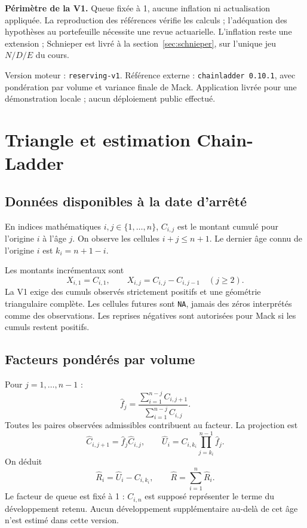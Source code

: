 \documentclass[11pt,a4paper]{article}
\newcommand{\smallnote}[1]{{\small\color{Muted}#1}}
\begin{document}
\begin{limitbox}
\textbf{Périmètre de la V1.} Queue fixée à 1, aucune inflation ni actualisation appliquée. La reproduction des références vérifie les calculs ; l'adéquation des hypothèses au portefeuille nécessite une revue actuarielle. L'inflation reste une extension ; Schnieper est livré à la section~\ref{sec:schnieper}, sur l'unique jeu $N/D/E$ du cours.
\end{limitbox}

\smallnote{Version moteur : \texttt{reserving-v1}. Référence externe : \texttt{chainladder 0.10.1}, avec pondération par volume et variance finale de Mack. Application livrée pour une démonstration locale ; aucun déploiement public effectué.}

\newpage
\section{Triangle et estimation Chain-Ladder}
\subsection*{Données disponibles à la date d'arrêté}
En indices mathématiques $i,j\in\{1,\ldots,n\}$, $C_{i,j}$ est le montant cumulé pour l'origine $i$ à l'âge $j$. On observe les cellules $i+j\leq n+1$. Le dernier âge connu de l'origine $i$ est $k_i=n+1-i$.

Les montants incrémentaux sont
\[
X_{i,1}=C_{i,1},\qquad X_{i,j}=C_{i,j}-C_{i,j-1}\quad(j\geq2).
\]
La V1 exige des cumuls observés strictement positifs et une géométrie triangulaire complète. Les cellules futures sont \texttt{NA}, jamais des zéros interprétés comme des observations. Les reprises négatives sont autorisées pour Mack si les cumuls restent positifs.

\subsection*{Facteurs pondérés par volume}
Pour $j=1,\ldots,n-1$ :
\[
\boxed{\widehat f_j=\frac{\sum_{i=1}^{n-j}C_{i,j+1}}{\sum_{i=1}^{n-j}C_{i,j}}.}
\]
Toutes les paires observées admissibles contribuent au facteur. La projection est
\[
\widehat C_{i,j+1}=\widehat f_j\widehat C_{i,j},\qquad
\boxed{\widehat U_i=C_{i,k_i}\prod_{j=k_i}^{n-1}\widehat f_j.}
\]
On déduit
\[
\boxed{\widehat R_i=\widehat U_i-C_{i,k_i},\qquad
\widehat R=\sum_{i=1}^n\widehat R_i.}
\]
Le facteur de queue est fixé à 1 : $C_{i,n}$ est supposé représenter le terme du développement retenu. Aucun développement supplémentaire au-delà de cet âge n'est estimé dans cette version.
\end{document}
